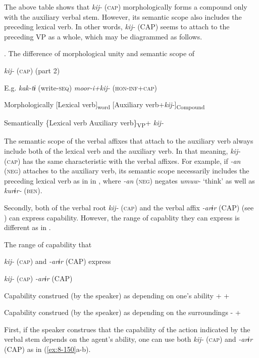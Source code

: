 The above table shows that \textit{kij-} (\textsc{cap}) morphologically forms a compound only with the auxiliary verbal stem. However, its semantic scope also includes the preceding lexical verb. In other words, \textit{kij-} (CAP) seems to attach to the preceding VP as a whole, which may be diagrammed as follows.

\begin{table}
\caption{\label{tab:key:90}. The difference of morphological unity and semantic scope of} \textmd{\textit{kij-}}\textmd{ (\textsc{cap}) (part 2)}

E.g.  \textit{kak-tɨ} (write-\textsc{seq})  \textit{moor-i+kij-} (\textsc{hon}-\textsc{inf}+\textsc{cap})

Morphologically  [Lexical verb]\textsubscript{word}  [Auxiliary verb+\textit{kij-}]\textsubscript{Compound}

Semantically  \{Lexical verb  Auxiliary verb\}\textsubscript{VP}+ \textit{kij-}
\end{table}

The semantic scope of the verbal affixes that attach to the auxiliary verb always include both of the lexical verb and the auxiliary verb. In that meaning, \textit{kij-} (\textsc{cap}) has the same characteristic with the verbal affixes. For example, if \textit{{}-an} (\textsc{neg}) attaches to the auxiliary verb, its semantic scope necessarily includes the preceding lexical verb as in  in , where \textit{-an} (\textsc{neg}) negates \textit{umuw-} ‘think’ as well as \textit{kurɨr-} (\textsc{ben}).

  Secondly, both of the verbal root \textit{kij-} (\textsc{cap}) and the verbal affix \textit{{}-arɨr} (CAP) (see ) can express capability. However, the range of capablity they can express is different as in .

\begin{table}
\caption{\label{tab:key:91}The range of capability that} \textmd{\textit{kij-}}\textmd{ (\textsc{cap}) and} \textmd{\textit{{}-arɨr}}\textmd{ (CAP) express}

  \textit{kij-} (\textsc{cap})  \textit{{}-arɨr} (CAP)

Capability construed (by the speaker) as depending on one’s ability  +  +

Capability construed (by the speaker) as depending on the surroundings  {}-  +
\end{table}

First, if the speaker construes that the capability of the action indicated by the verbal stem depends on the agent’s ability, one can use both \textit{kij-} (\textsc{cap}) and \textit{{}-arɨr} (CAP) as in (\ref{ex:8-150}a-b).

